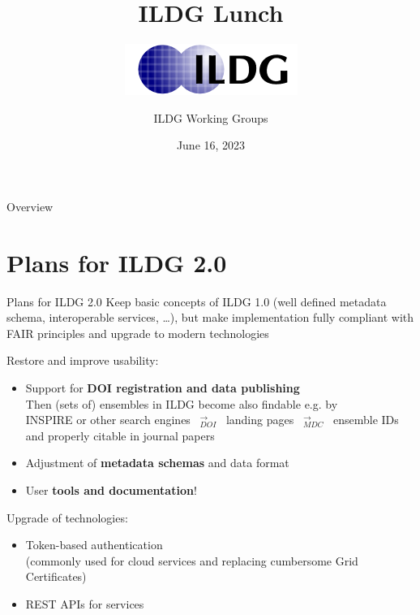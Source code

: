 \documentclass[aspectratio=169,xcolor=dvipsnames]{beamer}
\title[short title]{ILDG Lunch}
\subtitle{\includegraphics[scale=0.5]{ildg-logo}}
\author{ILDG Working Groups}
\date{June 16, 2023 } %
\begin{document}
\begin{frame}
    \titlepage

\end{frame}

\begin{frame}{Overview}
    \tableofcontents
\end{frame}

\section{Plans for ILDG 2.0}
\begin{frame}{Plans for ILDG 2.0}
  Keep basic concepts of ILDG 1.0 (well defined metadata schema, interoperable services, \ldots),
  but make implementation fully compliant with FAIR principles and upgrade to modern technologies

  \vspace*{3mm}
  Restore and improve usability:
  \begin{itemize}
  \item Support for {\bf DOI registration and data publishing}\\[1mm]
    {\small
      Then (sets of) ensembles in ILDG become also \alert{findable} e.g. by\\
      \hspace*{2em}INSPIRE or other search engines
      ~${}^{\longrightarrow}_{DOI}$~ landing pages
      ~${}^{\longrightarrow}_{MDC}$~ ensemble IDs
      \\
      and properly \alert{citable} in journal papers
    }
  \item Adjustment of {\bf metadata schemas} and data format
  \item User {\bf tools and documentation}!
  \end{itemize}

  \vspace*{3mm}
  Upgrade of technologies:
  \begin{itemize}
  \item Token-based authentication\\
    (commonly used for cloud services and replacing cumbersome Grid Certificates)
  \item REST APIs for services
  \end{itemize}

\end{frame}
\end{document}
